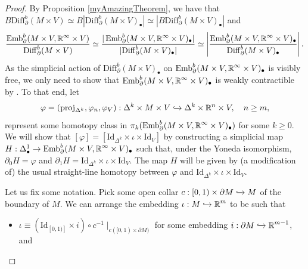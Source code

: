 \documentclass[a4paper, oneside]{amsart}
\newcommand{\diff}{\mathrm{Diff}}
\newcommand{\emb}{\operatorname{Emb}}
\newcommand{\Id}{\mathrm{Id}}
\newcommand{\1}{\mathds{1}}
\theoremstyle{remark}
\theoremstyle{definition}
\newcommand{\R}{{\scaleobj{0.97}{\mathbb{R}}}}
\numberwithin{equation}{section}
\begin{document}
\begin{proof}
    By Proposition \ref{myAmazingTheorem}, we have that $B\diff_\partial^b(M\times V)\simeq B|\diff_\partial^b(M\times V)_\bullet|\simeq |B\diff_\partial^b(M\times V)_\bullet|$ and 
    $$
\frac{\emb^b_\partial(M\times V,\R^\infty\times V)}{\diff^b_\partial(M\times V)}\simeq \frac{|\emb^b_\partial(M\times V,\R^\infty\times V)_\bullet|}{|\diff^b_\partial(M\times V)_\bullet|}\simeq \left|\frac{\emb^b_\partial(M\times V,\R^\infty\times V)_\bullet}{\diff^b_\partial(M\times V)_\bullet}\right|.
    $$
    As the simplicial action of $\diff^b_\partial(M\times V)_\bullet$ on $\emb^b_\partial(M\times V,\R^\infty\times V)_\bullet$ is visibly free, we only need to show that $\emb^b_\partial(M\times V,\R^\infty\times V)_\bullet$ is weakly contractible by \cite[Cor. 2.6]{GoerssJardine}. To that end, let 
    $$
    \varphi=(\mathrm{proj}_{\Delta^k}, \varphi_n,\varphi_V): \Delta^k\times M\times V\xhookrightarrow{}\Delta^k\times \R^n\times V, \quad n\geq m,$$
    represent some homotopy class in $\pi_k(\emb^b_\partial(M\times V,\R^\infty\times V)_\bullet)$ for some $k\geq 0$. We will show that $[\varphi]=[\Id_{\Delta^k}\times \iota\times \Id_V]$ by constructing a simplicial map $H: \Delta^1_\bullet \to \emb^b_\partial(M\times V,\R^\infty\times V)_\bullet$ such that, under the Yoneda isomorphism, $\partial_0H=\varphi$ and $\partial_1H=\Id_{\Delta^k}\times \iota\times \Id_V$. The map $H$ will be given by (a modification of) the usual straight-line homotopy between $\varphi$ and $\Id_{\Delta^k}\times \iota\times\Id_V$. 

    
    Let us fix some notation. Pick some open collar $c: [0,1)\times \partial M\xhookrightarrow{} M$ of the boundary of $M$. We can arrange the embedding $\iota: M\xhookrightarrow{}\R^m$ to be such that
    \begin{itemize}
        \item[($i$)] $\iota\equiv (\Id_{[0,1)]}\times i)\circ c^{-1}\mid_{c([0,1)\times \partial M)}$ for some embedding $i: \partial M\xhookrightarrow{}\R^{m-1}$, and


\end{itemize}
\end{proof}
\end{document}
